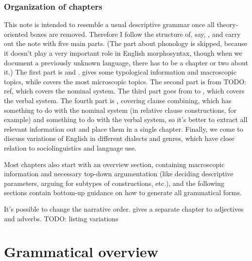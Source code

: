 \documentclass[UTF8, a4paper, oneside, scheme=plain]{ctexrep}
\begin{document}
\subsection{Organization of chapters}\label{sec:introduction.organization}

This note is intended to resemble a usual descriptive grammar 
once all theory-oriented boxes are removed.
Therefore I follow the structure of, say, \citet{Friesen2017},
and carry out the note with five main parts.
(The part about phonology is skipped,
because it doesn't play a very important role in English morphosyntax,
though when we document a previously unknown language,
there has to be a chapter or two about it.)
The first part is  and .
 gives some typological information and macroscopic topics,
while  covers the most microscopic topics.
The second part is from TODO: ref,
which covers the nominal system.
The third part goes from  to ,
which covers the verbal system.
The fourth part is ,
covering clause combining,
which has something to do with the nominal system 
(in relative clause constructions, for example)
and something to do with the verbal system,
so it's better to extract all relevant information out 
and place them in a single chapter.
Finally, we come to discuss variations of English
in different dialects and genres, 
which have close relation to sociolinguistics and language use.

Most chapters also start with an overview section,
containing macroscopic information and necessary top-down argumentation
(like deciding descriptive parameters,
arguing for subtypes of constructions, etc.),
and the following sections contain bottom-up guidance 
on how to generate all grammatical forms.

It's possible to change the narrative order.
\citet{cgel} gives a separate chapter to adjectives and adverbs.
TODO: listing variations

\chapter{Grammatical overview}\label{chap:overview}
\end{document}
